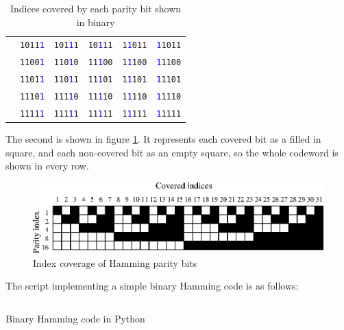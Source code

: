 \documentclass[11pt]{article}
\newenvironment{longlisting}
{\addvspace{\baselineskip}\captionsetup{type=listing}}
{\addvspace{\baselineskip}}
\begin{document}
\begin{table}[H]
\begin{center}
\begin{tabular}{l|rrrrr}
    & \texttt{1011\textcolor{blue}{1}} & \texttt{101\textcolor{blue}{1}1} & \texttt{10\textcolor{blue}{1}11} & \texttt{1\textcolor{blue}{1}011} & \texttt{\textcolor{blue}{1}1011} \\
    & \texttt{1100\textcolor{blue}{1}} & \texttt{110\textcolor{blue}{1}0} & \texttt{11\textcolor{blue}{1}00} & \texttt{1\textcolor{blue}{1}100} & \texttt{\textcolor{blue}{1}1100} \\
    & \texttt{1101\textcolor{blue}{1}} & \texttt{110\textcolor{blue}{1}1} & \texttt{11\textcolor{blue}{1}01} & \texttt{1\textcolor{blue}{1}101} & \texttt{\textcolor{blue}{1}1101} \\
    & \texttt{1110\textcolor{blue}{1}} & \texttt{111\textcolor{blue}{1}0} & \texttt{11\textcolor{blue}{1}10} & \texttt{1\textcolor{blue}{1}110} & \texttt{\textcolor{blue}{1}1110} \\
    & \texttt{1111\textcolor{blue}{1}} & \texttt{111\textcolor{blue}{1}1} & \texttt{11\textcolor{blue}{1}11} & \texttt{1\textcolor{blue}{1}111} & \texttt{\textcolor{blue}{1}1111} \\
    \bottomrule
    \end{tabular}
    \caption{Indices covered by each parity bit shown in binary}\label{tab:hamming-binary}
\end{center}
\end{table}

    The second is shown in figure \ref{fig:hamming}. It represents each covered
    bit as a filled in square, and each non-covered bit as an empty square, so
    the whole codeword is shown in every row.

\begin{figure}[H]
\begin{center}
\includegraphics{../psfiles/hamming_visualisation.eps}
\end{center}
\caption{Index coverage of Hamming parity bits}\label{fig:hamming}
\end{figure}

    The script implementing a simple binary Hamming code is as follows:

\begin{longlisting}
\inputminted{python}{../src/binary_hamming.py}
\caption{Binary Hamming code in Python}
\end{longlisting}
\end{document}

